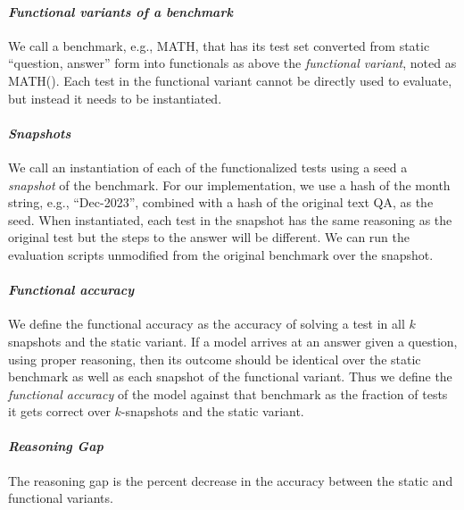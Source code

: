 \documentclass[11pt,a4paper]{article}
\begin{document}
\paragraph{\em Functional variants of a benchmark} We call a benchmark, e.g.,
MATH, that has its test set converted from static ``question, answer'' form
into functionals as above the {\em functional variant}, noted as MATH(). Each
test in the functional variant cannot be directly used to evaluate, but instead
it needs to be instantiated.

\paragraph{\em Snapshots} We call an instantiation of each of the
functionalized tests using a seed a {\em snapshot} of the benchmark. For our
implementation, we use a hash of the month string, e.g., ``Dec-2023'', combined
with a hash of the original text QA, as the seed. When instantiated, each test
in the snapshot has the same reasoning as the original test but the steps to
the answer will be different. We can run the evaluation scripts unmodified from the
original benchmark over the snapshot.

\paragraph{\em Functional accuracy} We define the functional accuracy as the
accuracy of solving a test in all $k$ snapshots and the static variant.  If a
model arrives at an answer given a question, using proper reasoning, then its
outcome should be identical over the static benchmark as well as each snapshot
of the functional variant. Thus we define the {\em functional accuracy} of the
model against that benchmark as the fraction of tests it gets correct over
$k$-snapshots and the static variant.

\paragraph{\em Reasoning Gap} The reasoning gap is the percent decrease in the
accuracy between the static and functional variants.
\end{document}
